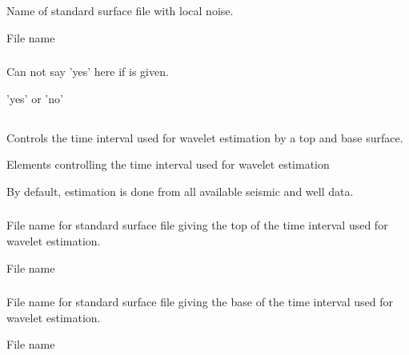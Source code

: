\subsubsection{}
 \slist
   \item \Description Name of standard surface file with local noise.
   \item \Argument File name
   \item \Default
 \elist

\subsubsection{}
 \slist
   \item \Description Can not say 'yes' here if  is given.
   \item \Argument 'yes' or 'no'
   \item \Default
 \elist

\subsection{}
 \slist
   \item \Description Controls the time interval used for wavelet estimation by a top and base surface.
   \item \Argument Elements controlling the time interval used for wavelet estimation
   \item \Default By default, estimation is done from all available seismic and well data.
 \elist

\subsubsection{}
 \slist
   \item \Description File name for standard surface file giving the top of the time interval used for wavelet estimation.
   \item \Argument File name
   \item \Default
 \elist

\subsubsection{}
 \slist
   \item \Description File name for standard surface file giving the base of the time interval used for wavelet estimation.
   \item \Argument File name
   \item \Default
 \elist


